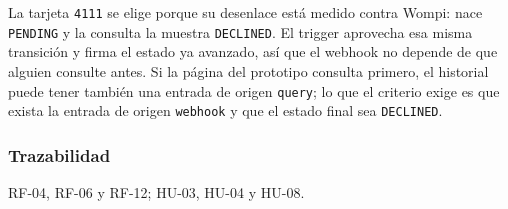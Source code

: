 La tarjeta \texttt{4111} se elige porque su desenlace está medido contra Wompi: nace \texttt{PENDING} y la consulta la muestra \texttt{DECLINED}. El trigger aprovecha esa misma transición y firma el estado ya avanzado, así que el webhook no depende de que alguien consulte antes. Si la página del prototipo consulta primero, el historial puede tener también una entrada de origen \texttt{query}; lo que el criterio exige es que exista la entrada de origen \texttt{webhook} y que el estado final sea \texttt{DECLINED}.

\subsubsection{Trazabilidad}

RF-04, RF-06 y RF-12; HU-03, HU-04 y HU-08.
